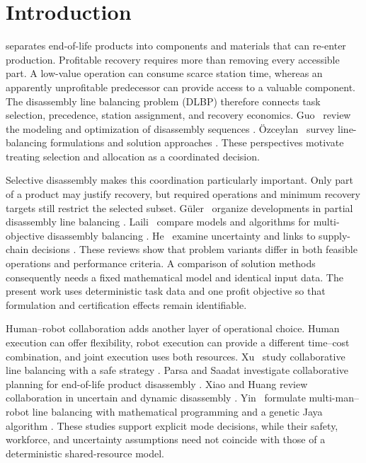 \section{Introduction}\label{sec:intro}
 separates end-of-life products into components and materials that can re-enter production. Profitable recovery requires more than removing every accessible part. A low-value operation can consume scarce station time, whereas an apparently unprofitable predecessor can provide access to a valuable component. The disassembly line balancing problem (DLBP) therefore connects task selection, precedence, station assignment, and recovery economics. Guo \etal\ review the modeling and optimization of disassembly sequences \cite{Guo2021}. \"Ozceylan \etal\ survey line-balancing formulations and solution approaches \cite{Ozceylan2019}. These perspectives motivate treating selection and allocation as a coordinated decision.

Selective disassembly makes this coordination particularly important. Only part of a product may justify recovery, but required operations and minimum recovery targets still restrict the selected subset. G\"uler \etal\ organize developments in partial disassembly line balancing \cite{Guler2024}. Laili \etal\ compare models and algorithms for multi-objective disassembly balancing \cite{Laili2020}. He \etal\ examine uncertainty and links to supply-chain decisions \cite{He2024}. These reviews show that problem variants differ in both feasible operations and performance criteria. A comparison of solution methods consequently needs a fixed mathematical model and identical input data. The present work uses deterministic task data and one profit objective so that formulation and certification effects remain identifiable.

Human--robot collaboration adds another layer of operational choice. Human execution can offer flexibility, robot execution can provide a different time--cost combination, and joint execution uses both resources. Xu \etal\ study collaborative line balancing with a safe strategy \cite{Xu2021}. Parsa and Saadat investigate collaborative planning for end-of-life product disassembly \cite{Parsa2021}. Xiao and Huang review collaboration in uncertain and dynamic disassembly \cite{Xiao2024}. Yin \etal\ formulate multi-man--robot line balancing with mathematical programming and a genetic Jaya algorithm \cite{Yin2025}. These studies support explicit mode decisions, while their safety, workforce, and uncertainty assumptions need not coincide with those of a deterministic shared-resource model.

